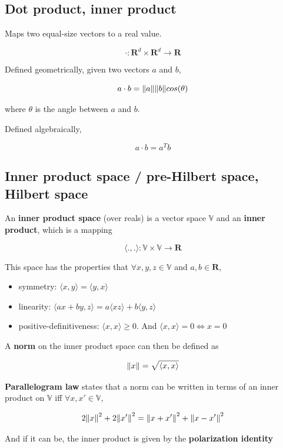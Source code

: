 \documentclass{article}
\begin{document}
\subsection{Dot product, inner product}

Maps two equal-size vectors to a real value.

$$
\cdot : \mathbf{R}^d \times \mathbf{R}^d \to \mathbf{R}
$$

Defined geometrically, given two vectors $a$ and $b$,

$$
a \cdot b = \norm{a} \norm{b} cos(\theta)
$$

where $\theta$ is the angle between $a$ and $b$.

Defined algebraically,

$$
a \cdot b = a^{T}b
$$

\subsection{Inner product space / pre-Hilbert space, Hilbert space}

An \textbf{inner product space} (over reals) is a vector space $\mathbb{V}$ and an \textbf{inner product}, which is a mapping

$$
\langle . , . \rangle : \mathbb{V} \times \mathbb{V} \to \mathbf{R}
$$

This space has the properties that $\forall x, y, z \in \mathbb{V}$ and $a, b \in \mathbf{R}$,
\begin{itemize}
  \item symmetry: $\langle x, y \rangle = \langle y, x \rangle$
  \item linearity: $\langle a x + b y , z \rangle = a \langle x z \rangle + b \langle y , z \rangle$
  \item positive-definitiveness: $\langle x , x \rangle \geq 0$. And $\langle x , x \rangle = 0 \Longleftrightarrow x = 0$
\end{itemize}

A \textbf{norm} on the inner product space can then be defined as

$$
\norm{x} = \sqrt{\langle x , x \rangle}
$$

\textbf{Parallelogram law} states that a norm can be written in terms of an inner product on $\mathbb{V}$ iff $\forall x, x' \in \mathbb{V}$,

$$
2 \norm{x}^2 + 2 \norm{x'}^2 = \norm{x + x'}^2 + \norm{x - x'}^2
$$

And if it can be, the inner product is given by the \textbf{polarization identity}
\end{document}
